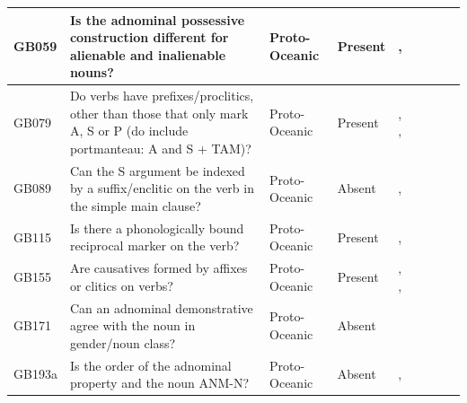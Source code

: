 \documentclass[draft,10pt]{article} %
\begin{document}
\begin{landscape}
\begin{longtable}{| p{2cm}| p{3cm}| p{2.5cm}|p{2cm}|p{2cm}|p{2cm}|p{2cm}|p{2cm}|p{2cm}|}
GB059&Is the adnominal possessive construction different for alienable and inalienable nouns?&Proto-Oceanic&Present&\citet[492, 511-512]{ross2004morphosyntactic}, \citet[69]{lynchrosscrowley_proto_grammar_oceanic}& \cellcolor{hedvig_lightgreen!50}{True Positive} & \cellcolor{hedvig_yellow!50}{Half} & \cellcolor{hedvig_lightgreen!50}{True Positive} & \cellcolor{hedvig_yellow!50}{Half} \\ \hline
GB079&Do verbs have prefixes/proclitics, other than those that only mark A, S or P (do include portmanteau: A and S + TAM)?&Proto-Oceanic&Present&\citet[142]{pawley1973some}, \citet[292]{ross2007two}, \citet[83]{lynchrosscrowley_proto_grammar_oceanic}& \cellcolor{hedvig_lightgreen!50}{True Positive} & \cellcolor{hedvig_yellow!50}{Half} & \cellcolor{hedvig_lightgreen!50}{True Positive} & \cellcolor{hedvig_yellow!50}{Half} \\ \hline
GB089&Can the S argument be indexed by a suffix/enclitic on the verb in the simple main clause?&Proto-Oceanic&Absent&\citet[498-499]{ross2004morphosyntactic}, \citet[83]{lynchrosscrowley_proto_grammar_oceanic}& \cellcolor{hedvig_lightgreen!50}{True Negative} & \cellcolor{hedvig_yellow!50}{Half} & \cellcolor{hedvig_yellow!50}{True Negative} & \cellcolor{hedvig_yellow!50}{Half} \\ \hline
GB115&Is there a phonologically bound reciprocal marker on the verb?&Proto-Oceanic&Present&\citet[172]{pawley1973some}, \citet[495, 513]{ross2004morphosyntactic}& \cellcolor{hedvig_lightgreen!50}{True Positive} & \cellcolor{hedvig_yellow!50}{Half} & \cellcolor{hedvig_lightgreen!50}{True Positive} & \cellcolor{hedvig_yellow!50}{Half} \\ \hline
GB155&Are causatives formed by affixes or clitics on verbs?&Proto-Oceanic&Present&\citet[74, 83]{lynchrosscrowley_proto_grammar_oceanic}, \citet[130]{pawley1973some}, \citet[344]{evans2003study}& \cellcolor{hedvig_lightgreen!50}{True Positive} & \cellcolor{hedvig_yellow!50}{Half} & \cellcolor{hedvig_lightgreen!50}{True Positive} & \cellcolor{hedvig_yellow!50}{False Negative} \\ \hline
GB171&Can an adnominal demonstrative agree with the noun in gender/noun class?&Proto-Oceanic&Absent&\citet[498]{ross2004morphosyntactic}& \cellcolor{hedvig_lightgreen!50}{True Negative} & \cellcolor{hedvig_yellow!50}{Half} & \cellcolor{hedvig_yellow!50}{True Negative} & \cellcolor{hedvig_yellow!50}{Half} \\ \hline
GB193a&Is the order of the adnominal property and the noun ANM-N?&Proto-Oceanic&Absent&\citet[497]{ross2004morphosyntactic}, \citet[74]{lynchrosscrowley_proto_grammar_oceanic}& \cellcolor{hedvig_lightgreen!50}{True Negative} & \cellcolor{hedvig_yellow!50}{Half} & \cellcolor{hedvig_yellow!50}{True Negative} & \cellcolor{hedvig_yellow!50}{Half} \\ \hline

\end{longtable}
\end{landscape}
\end{document}
